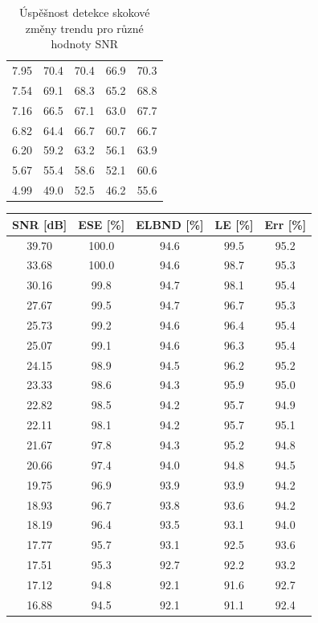 \documentclass[11pt,twoside,openright]{report}
\begin{document}
\begin{appendices}
\begin{table}[!h]
\begin{center}
\begin{tabular}{|c|c|c|c|c|}
7.95 & 70.4 & 70.4 & 66.9 & 70.3 \\ 
7.54 & 69.1 & 68.3 & 65.2 & 68.8 \\ 
7.16 & 66.5 & 67.1 & 63.0 & 67.7 \\ 
6.82 & 64.4 & 66.7 & 60.7 & 66.7 \\ 
6.20 & 59.2 & 63.2 & 56.1 & 63.9 \\ 
5.67 & 55.4 & 58.6 & 52.1 & 60.6 \\ 
4.99 & 49.0 & 52.5 & 46.2 & 55.6 \\ 
\hline
\end{tabular}
\caption{Úspěšnost detekce skokové změny trendu pro různé hodnoty SNR}
\label{tab:trend}
\end{center}
\end{table}


\begin{table}[h]
\begin{center}
\begin{tabular}{|c|c|c|c|c|}
\hline
\textbf{SNR [dB]} & \textbf{ESE [\%]} & \textbf{ELBND [\%]} & \textbf{LE [\%]} & \textbf{Err [\%]} \\ 
\hline
39.70 & 100.0 & 94.6 & 99.5 & 95.2 \\ 
33.68 & 100.0 & 94.6 & 98.7 & 95.3 \\ 
30.16 & 99.8 & 94.7 & 98.1 & 95.4 \\ 
27.67 & 99.5 & 94.7 & 96.7 & 95.3 \\ 
25.73 & 99.2 & 94.6 & 96.4 & 95.4 \\ 
25.07 & 99.1 & 94.6 & 96.3 & 95.4 \\ 
24.15 & 98.9 & 94.5 & 96.2 & 95.2 \\ 
23.33 & 98.6 & 94.3 & 95.9 & 95.0 \\ 
22.82 & 98.5 & 94.2 & 95.7 & 94.9 \\ 
22.11 & 98.1 & 94.2 & 95.7 & 95.1 \\ 
21.67 & 97.8 & 94.3 & 95.2 & 94.8 \\ 
20.66 & 97.4 & 94.0 & 94.8 & 94.5 \\ 
19.75 & 96.9 & 93.9 & 93.9 & 94.2 \\ 
18.93 & 96.7 & 93.8 & 93.6 & 94.2 \\ 
18.19 & 96.4 & 93.5 & 93.1 & 94.0 \\ 
17.77 & 95.7 & 93.1 & 92.5 & 93.6 \\ 
17.51 & 95.3 & 92.7 & 92.2 & 93.2 \\ 
17.12 & 94.8 & 92.1 & 91.6 & 92.7 \\ 
16.88 & 94.5 & 92.1 & 91.1 & 92.4 \\ 

\end{tabular}
\end{center}
\end{table}
\end{appendices}
\end{document}
